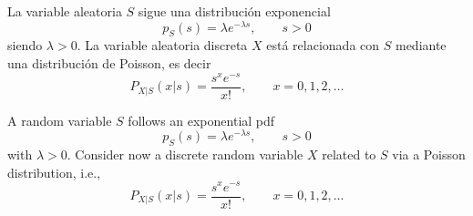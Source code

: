 \ifspanish

\question 
La variable aleatoria $S$ sigue una distribución exponencial
\[
p_{S}(s) = \lambda e^{-\lambda s}, \qquad s>0
\]
siendo $\lambda>0$. La variable aleatoria discreta $X$ está relacionada con $S$ mediante una distribución de Poisson, es decir
\[
P_{X|S}(x|s) = \frac{s^x e^{-s}}{x!}, \qquad x=0,1,2,\ldots
\]


\begin{solution}
 \end{solution}

\else

\question 
A random variable $S$ follows an exponential pdf
\[
p_{S}(s) = \lambda e^{-\lambda s}, \qquad s>0
\]
with $\lambda>0$. Consider now a discrete random variable $X$ related to $S$ via a Poisson distribution, i.e.,
\[
P_{X|S}(x|s) = \frac{s^x e^{-s}}{x!}, \qquad x=0,1,2,\ldots
\]

